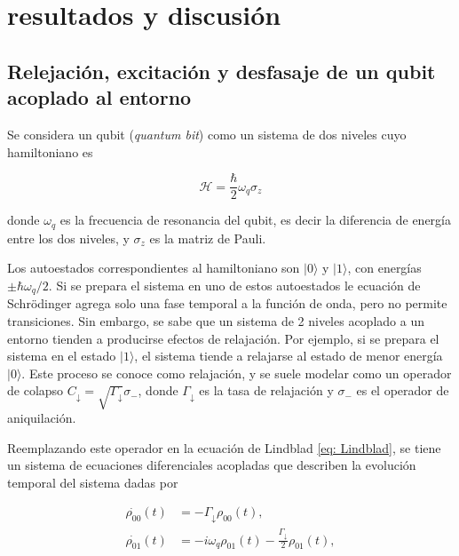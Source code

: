 \section{resultados y discusión}

\subsection{Relejación, excitación y desfasaje de un qubit acoplado al entorno} \label{sec: one_qubit}

Se considera un qubit (\textit{quantum bit}) como un sistema de dos niveles cuyo hamiltoniano es

\begin{equation} \label{eq: h_qubit}
    \mathcal{H} = \frac{\hbar}{2} \omega_q \sigma_z
\end{equation}

\noindent donde \(\omega_q\) es la frecuencia de resonancia del qubit, es decir la diferencia de energía entre los dos niveles, y \(\sigma_z\) es la matriz de Pauli.

Los autoestados correspondientes al hamiltoniano son \(|0\rangle\) y \(|1\rangle\), con energías \(\pm \hbar \omega_q / 2\). Si se prepara el sistema en uno de estos autoestados le ecuación de Schrödinger agrega solo una fase temporal a la función de onda, pero no permite transiciones. Sin embargo, se sabe que un sistema de 2 niveles acoplado a un entorno tienden a producirse efectos de relajación. Por ejemplo, si se prepara el sistema en el estado \(|1\rangle\), el sistema tiende a relajarse al estado de menor energía \(|0\rangle\). Este proceso se conoce como relajación, y se suele modelar como un operador de colapso \(C_\downarrow = \sqrt{\Gamma_\downarrow} \sigma_-\), donde \(\Gamma_\downarrow\) es la tasa de relajación y \(\sigma_-\) es el operador de aniquilación. 

Reemplazando este operador en la ecuación de Lindblad \ref{eq: Lindblad}, se tiene un sistema de ecuaciones diferenciales acopladas que describen la evolución temporal del sistema dadas por

\begin{align}
    \dot{\rho_{00}}(t) &= -\Gamma_\downarrow \rho_{00}(t), \label{eq: p00_relajacion_dif} \\
    \dot{\rho_{01}}(t) &= -i \omega_q \rho_{01}(t) - \frac{\Gamma_\downarrow}{2} \rho_{01}(t), \label{eq: p01_relajacion_dif}
\end{align}

